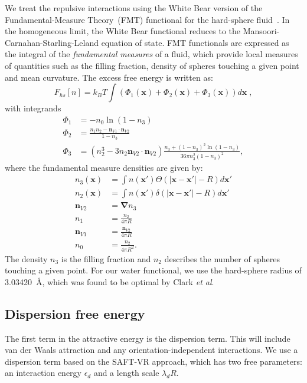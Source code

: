 \documentclass[letterpaper,twocolumn,amsmath,amssymb,prb]{revtex4-1}
\newcommand{\xx}{\textbf{x}}
\begin{document}
We treat the repulsive interactions using the White Bear version of
the Fundamental-Measure Theory~(FMT) functional for the hard-sphere
fluid~\cite{roth2002whitebear}.  In the homogeneous limit, the White
Bear functional reduces to the Mansoori-Carnahan-Starling-Leland
equation of state.  FMT functionals are expressed as the integral of
the \emph{fundamental measures} of a fluid, which provide local
measures of quantities such as the filling fraction, density of
spheres touching a given point and mean curvature.  The excess free
energy is written as:
\begin{equation}
F_{hs}[n] = k_B T \int (\Phi_1(\xx) + \Phi_2(\xx) + \Phi_3(\xx)) d\xx \; ,
\end{equation}
with integrands
\begin{align}
\Phi_1 &= -n_0 \ln\left( 1 - n_3\right)\\
\Phi_2 &= \frac{n_1 n_2 - \mathbf{n}_{V1} \cdot\mathbf{n}_{V2}}{1-n_3} \\
\Phi_3 &= (n_2^3 - 3n_2 \mathbf{n}_{V2} \cdot \mathbf{n}_{V2})
  \frac{
    n_3 + (1-n_3)^2\ln(1-n_3)
  }{
    36\pi n_3^2\left( 1 - n_3 \right)^2
  } ,
\end{align}
where the fundamental measure densities are given by:
\begin{align}
  n_3(\xx) &= \int n(\xx') \Theta(\left|\xx - \xx'\right| - R) d\xx' \\
  n_2(\xx) &= \int n(\xx') \delta(\left|\xx - \xx'\right| - R) d\xx'
  \\
  \mathbf{n}_{V2} &= \mathbf{\nabla} n_3 \\
  n_1 &= \frac{n_2}{4\pi R}\\
  \mathbf{n}_{V1} &= \frac{\mathbf{n}_{V2}}{4\pi R}\\
  n_0 &= \frac{n_2}{4\pi R^2}.
\end{align}
The density $n_3$ is the filling fraction and $n_2$ describes the number
of spheres touching a given point. For our water functional, we use the 
hard-sphere radius of
3.03420~\AA, which was found to be optimal by Clark
\emph{et al}.\cite{clark2006developing}

\newcommand\etadisp{\ensuremath{\eta_\textit{d}}}
\newcommand\epsilondisp{\ensuremath{\epsilon_\textit{d}}}
\newcommand\epsilonassoc{\ensuremath{\epsilon_\textit{a}}}
\newcommand\kappaassoc{\ensuremath{\kappa_\textit{a}}}
\newcommand\lambdadisp{\ensuremath{\lambda_\textit{d}}}
\newcommand\lscale{\ensuremath{s_d}}
\subsection{Dispersion free energy}
The first term in the attractive energy is the dispersion term.  This
will include van der Waals attraction and any orientation-independent
interactions. We use a dispersion term based on the SAFT-VR
approach\cite{gil-villegas-1997-SAFT-VR}, which has two free
parameters: an interaction energy $\epsilondisp$ and a
length scale $\lambdadisp R$.
\end{document}
